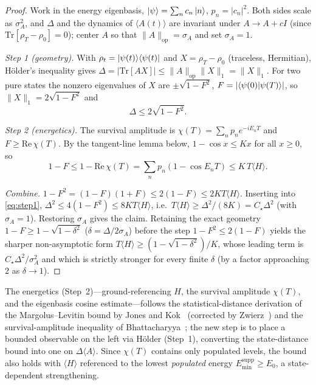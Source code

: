 \documentclass[aps,pra,twocolumn,superscriptaddress,nofootinbib,longbibliography]{revtex4-2}
\newcommand{\Ctrue}{C_{\star}}
\newcommand{\mean}[1]{\langle #1 \rangle}
\newcommand{\Tr}{\mathrm{Tr}}
\begin{document}
\begin{proof}
Work in the energy eigenbasis, $\ket{\psi}=\sum_n c_n\ket n$, $p_n=|c_n|^2$. Both sides scale as
$\sigma_A^2$, and $\Delta$ and the dynamics of $\mean{A(t)}$ are invariant under $A\to A+cI$ (since
$\Tr[\rho_T-\rho_0]=0$); center $A$ so that $\|A\|_{\mathrm{op}}=\sigma_A$ and set $\sigma_A=1$.

\emph{Step 1 (geometry).} With $\rho_t=\ket{\psi(t)}\!\bra{\psi(t)}$ and $X=\rho_T-\rho_0$ (traceless,
Hermitian), Hölder's inequality gives $\Delta=|\Tr[AX]|\le\|A\|_{\mathrm{op}}\|X\|_1=\|X\|_1$. For two pure
states the nonzero eigenvalues of $X$ are $\pm\sqrt{1-F^2}$, $F=|\!\braket{\psi(0)|\psi(T)}\!|$, so
$\|X\|_1=2\sqrt{1-F^2}$ and
\begin{equation}
\Delta\le 2\sqrt{1-F^2}.
\label{eq:step1}
\end{equation}

\emph{Step 2 (energetics).} The survival amplitude is $\chi(T)=\sum_n p_n e^{-iE_nT}$ and $F\ge\mathrm{Re}\,\chi(T)$.
By the tangent-line lemma below, $1-\cos x\le Kx$ for all $x\ge0$, so
\begin{equation}
1-F\le 1-\mathrm{Re}\,\chi(T)=\sum_n p_n(1-\cos E_nT)\le K\,T\mean{H}.
\label{eq:step2}
\end{equation}

\emph{Combine.} $1-F^2=(1-F)(1+F)\le 2(1-F)\le 2KT\mean H$. Inserting into \eqref{eq:step1},
$\Delta^2\le 4(1-F^2)\le 8KT\mean H$, i.e.\ $T\mean H\ge \Delta^2/(8K)=\Ctrue\Delta^2$ (with $\sigma_A=1$).
Restoring $\sigma_A$ gives the claim. Retaining the exact geometry $1-F\ge1-\sqrt{1-\delta^2}$
($\delta=\Delta/2\sigma_A$) before the step $1-F^2\le2(1-F)$ yields the sharper non-asymptotic form
$T\mean H\ge(1-\sqrt{1-\delta^2})/K$, whose leading term is $\Ctrue\Delta^2/\sigma_A^2$ and which is strictly
stronger for every finite $\delta$ (by a factor approaching $2$ as $\delta\to1$).
\end{proof}

\noindent The energetics (Step~2)---ground-referencing $H$, the survival amplitude $\chi(T)$, and the
eigenbasis cosine estimate---follows the statistical-distance derivation of the Margolus--Levitin bound by
Jones and Kok~\cite{JonesKok2010GeometricDerivation} (corrected by Zwierz~\cite{Zwierz2012Comment}) and the
survival-amplitude inequality of Bhattacharyya~\cite{Bhattacharyya1983}; the new step is to place a bounded
observable on the left via Hölder (Step~1), converting the state-distance bound into one on $\Delta\mean{A}$.
Since $\chi(T)$ contains only populated levels, the bound also holds with $\mean H$ referenced to the lowest
\emph{populated} energy $E_{\min}^{\mathrm{supp}}\ge E_0$, a state-dependent strengthening.
\end{document}
